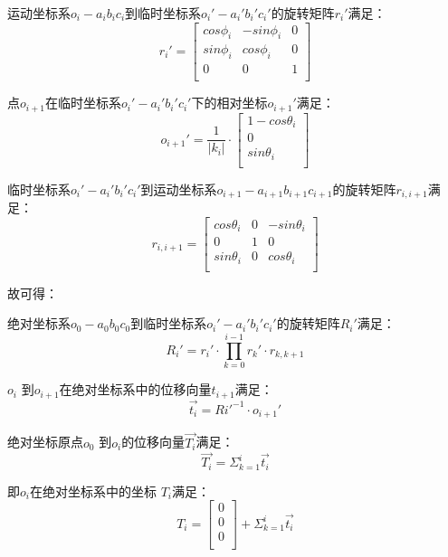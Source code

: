 \begin{itemize}
运动坐标系$o_i-a_ib_ic_i$到临时坐标系$o_i'-a_i'b_i'c_i'$的旋转矩阵$r_i'$满足：
    \begin{equation}
    r_i' = \left[
            \begin{matrix}
            cos\phi_i & -sin\phi_i & 0\\
            sin\phi_i & cos\phi_i & 0\\
            0 & 0 & 1\\
            \end{matrix}
        \right]
    \end{equation}
    
点$o_{i+1}$在临时坐标系$o_i'-a_i'b_i'c_i'$下的相对坐标$o_{i+1}'$满足：
    \begin{equation}
    o_{i+1}' = \frac{1}{|k_i|} \cdot \left[
      \begin{matrix}
    	1 - cos\theta_i\\
    	0 \\
      sin\theta_i\\
      \end{matrix}
    \right]
    \end{equation}
    
临时坐标系$o_i'-a_i'b_i'c_i'$到运动坐标系$o_{i+1}-a_{i+1}b_{i+1}c_{i+1}$的旋转矩阵$r_{i, i+1}$满足：
    \begin{equation}
    r_{i, i+1} = \left[
      \begin{matrix}
      cos \theta_i & 0 & -sin \theta_i\\
      0 &1 & 0\\
      sin \theta_i & 0 & cos \theta_i\\
      \end{matrix}
    \right]
    \end{equation}

故可得：

绝对坐标系$o_0-a_0b_0c_0$到临时坐标系$o_i'-a_i'b_i'c_i'$的旋转矩阵$R_i'$满足：
    \begin{equation}
    R_i' = r_i' \cdot \prod_{k = 0}^{i-1} r_k' \cdot r_{k, k+1}
    \end{equation}
    
$o_i$ 到$o_{i+1}$在绝对坐标系中的位移向量$t_{i+1}$满足：
    \begin{equation}
    \vec{t_i} = Ri'^{-1}\cdot o_{i+1}'
    \end{equation}

绝对坐标原点$o_0$ 到$o_i$的位移向量$\vec{T_i}$满足：
    \begin{equation}
    \vec{T_i} = \Sigma_{k=1} ^ {i} \vec{t_i}
    \end{equation}

即$o_i$在绝对坐标系中的坐标 $T_i$满足\cite{用于光纤光栅曲线重建算法的坐标点拟合}：
\begin{equation}
T_i = \left[
    \begin{matrix}
    0\\
    0\\
    0\\
  	\end{matrix}
  \right]
  + \Sigma_{k=1} ^ {i} \vec{t_i}
\end{equation}

\end{itemize}

